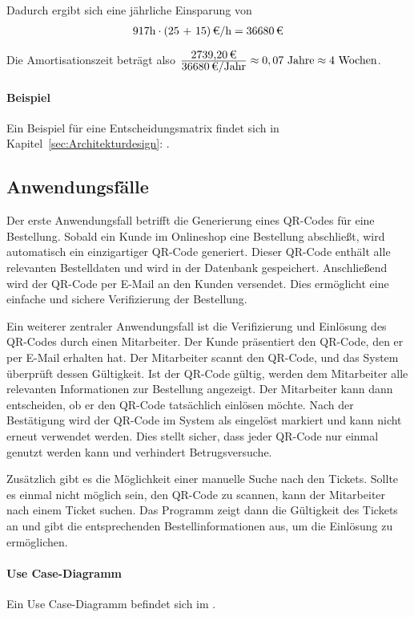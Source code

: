 Dadurch ergibt sich eine jährliche Einsparung von 
\begin{eqnarray}
917 \mbox{h} \cdot \eur{(25 + 15)}{\mbox{/h}} = \eur{36680}
\end{eqnarray}

Die Amortisationszeit beträgt also $\frac{\eur{2739,20}}{\eur{36680}\mbox{/Jahr}} \approx 0,07 \mbox{ Jahre} \approx 4 \mbox{ Wochen}$.

\paragraph{Beispiel}
Ein Beispiel für eine Entscheidungsmatrix findet sich in Kapitel~\ref{sec:Architekturdesign}: .


\subsection{Anwendungsfälle}
\label{sec:Anwendungsfaelle}

Der erste Anwendungsfall betrifft die Generierung eines QR-Codes für eine Bestellung. Sobald ein Kunde im Onlineshop eine Bestellung abschließt, wird automatisch ein einzigartiger QR-Code generiert. Dieser QR-Code enthält alle relevanten Bestelldaten und wird in der Datenbank gespeichert. Anschließend wird der QR-Code per E-Mail an den Kunden versendet. Dies ermöglicht eine einfache und sichere Verifizierung der Bestellung.

Ein weiterer zentraler Anwendungsfall ist die Verifizierung und Einlösung des QR-Codes durch einen Mitarbeiter. Der Kunde präsentiert den QR-Code, den er per E-Mail erhalten hat. Der Mitarbeiter scannt den QR-Code, und das System überprüft dessen Gültigkeit. Ist der QR-Code gültig, werden dem Mitarbeiter alle relevanten Informationen zur Bestellung angezeigt. Der Mitarbeiter kann dann entscheiden, ob er den QR-Code tatsächlich einlösen möchte. Nach der Bestätigung wird der QR-Code im System als eingelöst markiert und kann nicht erneut verwendet werden. Dies stellt sicher, dass jeder QR-Code nur einmal genutzt werden kann und verhindert Betrugsversuche.

Zusätzlich gibt es die Möglichkeit einer manuelle Suche nach den Tickets. Sollte es einmal nicht möglich sein, den QR-Code zu scannen, kann der Mitarbeiter nach einem Ticket suchen. Das Programm zeigt dann die Gültigkeit des Tickets an und gibt die entsprechenden Bestellinformationen aus, um die Einlösung zu ermöglichen.

\paragraph{Use Case-Diagramm}
Ein Use Case-Diagramm befindet sich im .

